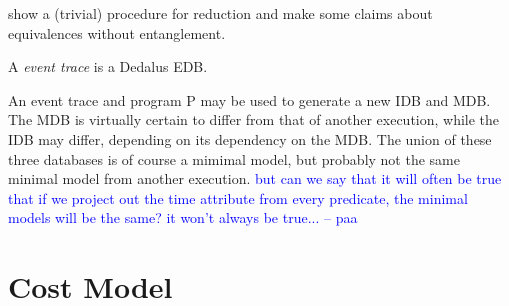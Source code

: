 \documentclass{acm_proc_article-sp-sigmod09}
\newcommand{\paa}[1]{{\textcolor{blue}{#1 -- paa}}}
\begin{document}
show a (trivial) procedure for reduction and make some claims about equivalences without entanglement.

\begin{definition}
A \emph{event trace} is a Dedalus EDB.
\end{definition}

An event trace and program P may be used to generate a new IDB and MDB.  The MDB is virtually certain to differ from that of another
execution, while the IDB may differ, depending on its dependency on the MDB.  The union of these three databases is of course a
mimimal model, but probably not the same minimal model from another execution.  \paa{but can we say that it will often be true that if we project 
out the time attribute from every predicate, the minimal models will be the same? it won't always be true...}

\section{Cost Model}
 
\end{document}
